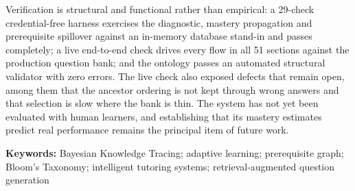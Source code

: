 Verification is structural and functional rather than empirical: a 29-check
credential-free harness exercises the diagnostic, mastery propagation and
prerequisite spillover against an in-memory database stand-in and passes
completely; a live end-to-end check drives every flow in all 51 sections against
the production question bank; and the ontology passes an automated structural
validator with zero errors. The live check also exposed defects that remain
open, among them that the ancestor ordering is not kept through wrong answers
and that selection is slow where the bank is thin. The system has not yet been
evaluated with human learners, and establishing that its mastery estimates
predict real performance remains the principal item of future work.

\vspace{12pt}
\noindent\textbf{Keywords:} Bayesian Knowledge Tracing; adaptive learning;
prerequisite graph; Bloom's Taxonomy; intelligent tutoring systems;
retrieval-augmented question generation
\endgroup
\clearpage

